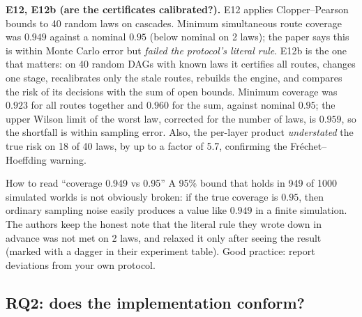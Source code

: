 \textbf{E12, E12b (are the certificates calibrated?).} E12 applies Clopper--Pearson bounds to 40 random laws on cascades. Minimum simultaneous route coverage was $0.949$ against a nominal $0.95$ (below nominal on 2 laws); the paper says this is within Monte Carlo error but \emph{failed the protocol's literal rule}. E12b is the one that matters: on 40 random DAGs with known laws it certifies all routes, changes one stage, recalibrates only the stale routes, rebuilds the engine, and compares the risk of its decisions with the sum of open bounds. Minimum coverage was $0.923$ for all routes together and $0.960$ for the sum, against nominal $0.95$; the upper Wilson limit of the worst law, corrected for the number of laws, is $0.959$, so the shortfall is within sampling error. Also, the per-layer product \emph{understated} the true risk on 18 of 40 laws, by up to a factor of 5.7, confirming the Fr\'echet--Hoeffding warning.

\begin{warning}{How to read ``coverage 0.949 vs 0.95''}
A 95\% bound that holds in 949 of 1000 simulated worlds is not obviously broken: if the true coverage is $0.95$, then ordinary sampling noise easily produces a value like $0.949$ in a finite simulation. The authors keep the honest note that the literal rule they wrote down in advance was not met on 2 laws, and relaxed it only after seeing the result (marked with a dagger in their experiment table). Good practice: report deviations from your own protocol.
\end{warning}

\subsection{RQ2: does the implementation conform?}

